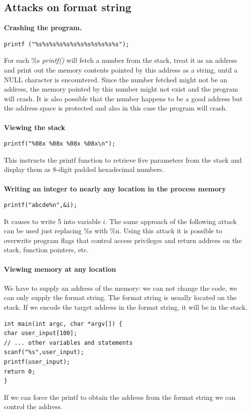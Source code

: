 \documentclass[10pt,a4paper]{article}
\begin{document}
\subsection{Attacks on format string}
\textbf{Crashing the program.}
\begin{verbatim}
printf ("%s%s%s%s%s%s%s%s%s%s%s%s");
\end{verbatim}
For each \%s \emph{printf()} will fetch a number from the stack, treat it as an address and print out the memory contents pointed by this address as a string, until a NULL character is encountered. Since the number fetched might not be an address, the memory pointed by this number might not exist and the program will crash. It is also possible that the number happens to be a good address but the address space is protected and also in this case the program will crash.\\\\
\textbf{Viewing the stack}
\begin{verbatim}
printf("%08x %08x %08x %08x\n");
\end{verbatim}
This instructs the printf function to retrieve five parameters from the stack and display them as 8-digit padded hexadecimal numbers.\\\\
\textbf{Writing an integer to nearly any location in the process memory}
\begin{verbatim}
printf("abcde%n",&i);
\end{verbatim}
It causes to write 5 into variable $i$. The same approach of the following attack can be used just replacing \%s with \%n. Using this attack it is possible to overwrite program flags that control access privileges and return address on the stack, function pointers, etc.\\\\
\textbf{Viewing memory at any location}\\\\
We have to supply an address of the memory: we can not change the code, we can only supply the format string. The format string is usually located on the stack. If we encode the target address in the format string, it will be in the stack.
\begin{verbatim}
int main(int argc, char *argv[]) {
char user_input[100];
// ... other variables and statements
scanf("%s",user_input);
printf(user_input);
return 0;
}
\end{verbatim}
\newpage
If we can force the printf to obtain the address from the format string we can control the address.
\end{document}
